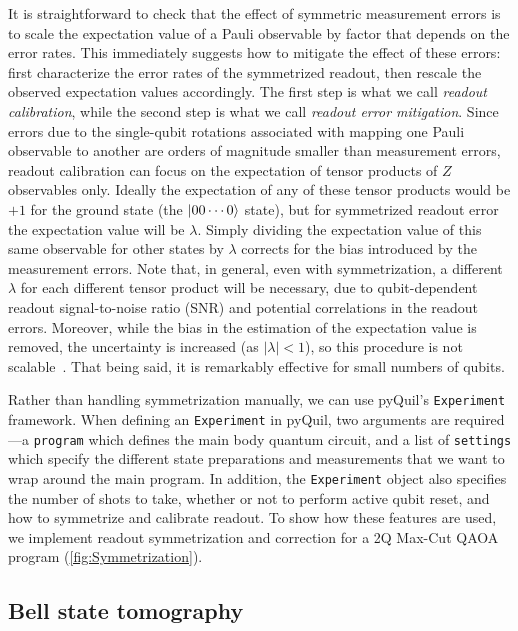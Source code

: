 \documentclass[12pt]{iopart}
\begin{document}
It is straightforward to check that the effect of symmetric measurement errors is to scale the expectation value of a Pauli observable by factor that depends on the error rates. This immediately suggests how to mitigate the effect of these errors: first characterize the error rates of the symmetrized readout, then rescale the observed expectation values accordingly. The first step is what we call {\em readout calibration}, while the second step is what we call {\em readout error mitigation}. Since errors due to the single-qubit rotations associated with mapping one Pauli observable to another are orders of magnitude smaller than measurement errors, readout calibration can focus on the expectation of tensor products of $Z$ observables only. Ideally the expectation of any of these tensor products would be $+1$ for the ground state (the $\ket{00\cdots0}$ state), but for symmetrized readout error the expectation value will be $\lambda$. Simply dividing the expectation value of this same observable for other states by $\lambda$ corrects for the bias introduced by the measurement errors. Note that, in general, even with symmetrization, a different $\lambda$ for each different tensor product will be necessary, due to qubit-dependent readout signal-to-noise ratio (SNR) and potential correlations in the readout errors. Moreover, while the bias in the estimation of the expectation value is removed, the uncertainty is increased (as $|\lambda|<1$), so this procedure is not scalable~\cite{Ryan2015}. That being said, it is remarkably effective for small numbers of qubits.

Rather than handling symmetrization manually, we can use pyQuil's \texttt{Experiment} framework. When defining an \texttt{Experiment} in pyQuil, two arguments are required---a \texttt{program} which defines the main body quantum circuit, and a list of \texttt{settings} which specify the different state preparations and measurements that we want to wrap around the main program. In addition, the \texttt{Experiment} object also specifies the number of shots to take, whether or not to perform active qubit reset, and how to symmetrize and calibrate readout. To show how these features are used, we implement readout symmetrization and correction for a 2Q Max-Cut QAOA program (\cref{fig:Symmetrization}).

\subsection{Bell state tomography}
\end{document}
